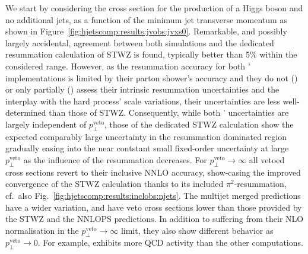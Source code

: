 We start by considering 
the cross section for the production of a Higgs boson and no 
additional jets, as a function of the minimum jet transverse momentum 
as shown in Figure~\ref{fig:hjetscomp:results:jvobs:jvxs0}. Remarkable, 
and possibly largely accidental, 
agreement between both \NNLOPS simulations and the dedicated resummation 
calculation of STWZ is found, typically better than 5\% within the considered range. 
However, as the resummation accuracy for both \NNLOPS' implementations is 
limited by their parton 
shower's accuracy and they do not (\Powheg) or only partially (\Sherpa) 
assess their intrinsic resummation uncertainties and the interplay with 
the hard process' scale variations, their uncertainties are less 
well-determined than those of STWZ. Consequently, while both \NNLOPS' uncertainties are largely 
independent of $p_\perp^\text{veto}$, those of the dedicated STWZ calculation 
show the expected comparably large uncertainty in the resummation dominated 
region gradually easing into the near contstant small fixed-order uncertainty 
at large $p_\perp^\text{veto}$ as the influence of the resummation decreases. 
For $p_\perp^\text{veto}\to\infty$ all vetoed cross sections revert to their 
inclusive NNLO accuracy, show-casing the improved convergence of the STWZ 
calculation thanks to its included $\pi^2$-resummation, cf.\ also Fig.\ 
\ref{fig:hjetscomp:results:inclobs:njets}. 
The multijet merged predictions have a wider variation, and have veto cross sections lower than
those provided by the STWZ and the NNLOPS predictions. In addition to 
suffering from their NLO normalisation in the $p_\perp^\text{veto}\to\infty$ 
limit, they also show different behavior as $p_\perp^\text{veto}\to 0$. For example, 
\Sherpa \MEPSatNLO exhibits more QCD activity than the other computations. 

